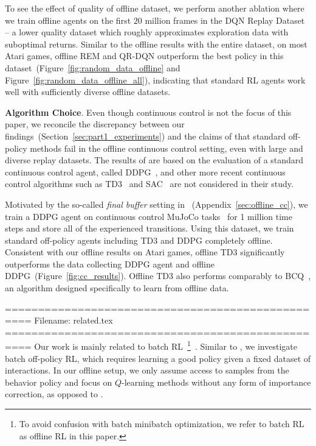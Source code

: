To see the effect of quality of offline dataset, we perform another ablation where we train offline agents on the first $20$ million frames in the DQN Replay Dataset -- a lower quality dataset which roughly approximates exploration data with suboptimal returns. Similar to the offline results with the entire dataset, on most Atari games, offline REM and QR-DQN outperform the best policy in this dataset~(Figure~\ref{fig:random_data_offline} and Figure~\ref{fig:random_data_offline_all}), indicating that standard RL agents work well with sufficiently diverse offline datasets. 

{\bf Algorithm Choice}. Even though continuous control is not the focus of this paper, we reconcile the discrepancy between our findings~(Section~\ref{sec:part1_experiments}) and the claims of \citet{fujimoto2018off} that standard off-policy methods fail in the offline continuous control setting, even with large and diverse replay datasets. The results of \citet{fujimoto2018off} are based on the evaluation of a standard continuous control agent, called DDPG~\citep{lillicrap2015continuous}, and other more recent continuous control algorithms such as
TD3~\citep{fujimoto2018addressing} and SAC~\citep{haarnoja2018soft} are not considered in their study.

Motivated by the so-called \textit{final buffer} setting in \citet{fujimoto2018off}~(Appendix~\ref{sec:offline_cc}), we train a DDPG agent on continuous control MuJoCo
tasks~\citep{todorov2012mujoco} for 1 million time steps and store all of the experienced transitions. Using this dataset, we train standard off-policy agents including TD3 and DDPG completely offline. Consistent with our offline results on Atari games, offline TD3 significantly outperforms the data collecting DDPG agent and offline DDPG~(Figure~\ref{fig:cc_results}). Offline TD3 also performs comparably to BCQ~\citep{fujimoto2018off}, an algorithm designed specifically to learn from offline data.




==================================================
Filename: related.tex
==================================================
Our work is mainly related to batch RL~\footnote{To avoid confusion
with batch \versus minibatch optimization, we refer to batch RL as
offline RL in this paper.}~\citep{lange2012batch}.
Similar to \citep{ernst2005tree, riedmiller2005neural, jaques2019way}, we investigate batch off-policy RL,
which requires learning a good policy given a fixed dataset of interactions.
In our offline setup, we only assume access to samples from the behavior policy and focus
on $Q$-learning methods without any form of importance correction, as opposed to
\citep{swaminathanjoachims15c, liu2019off}.

